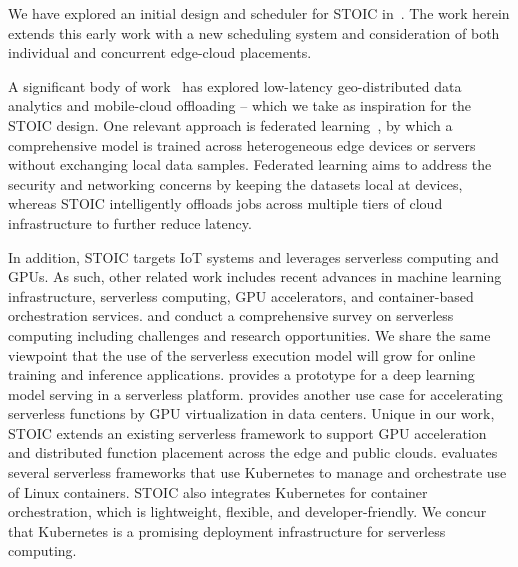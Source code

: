 We have explored an initial design and scheduler for STOIC in~\cite{ref:stoic2020}.  The work herein extends this early work with a new scheduling system and consideration of both individual and concurrent edge-cloud placements. 

A significant body of work~\cite{ref:lowlatency, ref:bandwidth, ref:MAUI} has explored low-latency geo-distributed data analytics and mobile-cloud offloading -- which we take as inspiration for the STOIC design. One relevant approach is
federated learning~\cite{ref:federated}, by which a comprehensive model is
trained across heterogeneous edge devices or servers without exchanging local
data samples. Federated learning aims to address the security and networking
concerns by keeping the datasets local at devices, whereas STOIC intelligently
offloads jobs across multiple tiers of cloud infrastructure to further reduce
latency. 

In addition, STOIC targets IoT systems and leverages serverless computing and GPUs. As such, other related work includes recent advances in machine learning infrastructure, serverless computing, GPU accelerators, and container-based orchestration services. \cite{ref:serverlessstep} and \cite{ref:berkeleyserverless} conduct a comprehensive survey on serverless computing including challenges and research opportunities. We share the same viewpoint that the use of the serverless execution model will grow for online training and inference applications. \cite{ref:deepserving} provides a prototype for a deep learning model serving in a serverless platform. \cite{ref:accelerated} provides another use case for accelerating serverless functions by GPU virtualization in data centers. Unique in our work, STOIC extends an existing serverless framework to support GPU acceleration and distributed function placement across the edge and public clouds. \cite{ref:evaluation} evaluates several serverless frameworks that use Kubernetes to manage and orchestrate use of Linux containers. STOIC also integrates Kubernetes for container orchestration, which is lightweight, flexible, and developer-friendly. We concur that Kubernetes is a promising deployment infrastructure for serverless computing.  

